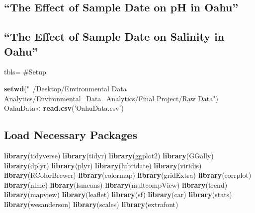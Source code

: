 \documentclass[12pt,]{article}
\newenvironment{Shaded}{\begin{snugshade}}{\end{snugshade}}
\newcommand{\KeywordTok}[1]{\textcolor[rgb]{0.13,0.29,0.53}{\textbf{#1}}}
\newcommand{\StringTok}[1]{\textcolor[rgb]{0.31,0.60,0.02}{#1}}
\newcommand{\NormalTok}[1]{#1}
\begin{document}
\subsection{\texorpdfstring{``The Effect of Sample Date on pH in
Oahu''}{The Effect of Sample Date on pH in Oahu}}\label{the-effect-of-sample-date-on-ph-in-oahu}

\subsection{\texorpdfstring{``The Effect of Sample Date on Salinity in
Oahu''}{The Effect of Sample Date on Salinity in Oahu}}\label{the-effect-of-sample-date-on-salinity-in-oahu}

\newpage

\listoffigures  \newpage

tbls= \#Setup

\begin{Shaded}
\begin{Highlighting}[]
\KeywordTok{setwd}\NormalTok{(}\StringTok{"~/Desktop/Environmental Data Analytics/Environmental_Data_Analytics/Final Project/Raw Data"}\NormalTok{)}
\NormalTok{OahuData<-}\KeywordTok{read.csv}\NormalTok{(}\StringTok{'OahuData.csv'}\NormalTok{)}
\end{Highlighting}
\end{Shaded}

\subsection{Load Necessary Packages}\label{load-necessary-packages}

\begin{Shaded}
\begin{Highlighting}[]
\KeywordTok{library}\NormalTok{(tidyverse)}
\KeywordTok{library}\NormalTok{(tidyr)}
\KeywordTok{library}\NormalTok{(ggplot2)}
\KeywordTok{library}\NormalTok{(GGally)}
\KeywordTok{library}\NormalTok{(dplyr)}
\KeywordTok{library}\NormalTok{(plyr)}
\KeywordTok{library}\NormalTok{(lubridate)}
\KeywordTok{library}\NormalTok{(viridis)}
\KeywordTok{library}\NormalTok{(RColorBrewer)}
\KeywordTok{library}\NormalTok{(colormap)}
\KeywordTok{library}\NormalTok{(gridExtra)}
\KeywordTok{library}\NormalTok{(corrplot)}
\KeywordTok{library}\NormalTok{(nlme)}
\KeywordTok{library}\NormalTok{(lsmeans)}
\KeywordTok{library}\NormalTok{(multcompView)}
\KeywordTok{library}\NormalTok{(trend)}
\KeywordTok{library}\NormalTok{(mapview)}
\KeywordTok{library}\NormalTok{(leaflet)}
\KeywordTok{library}\NormalTok{(sf)}
\KeywordTok{library}\NormalTok{(car)}
\KeywordTok{library}\NormalTok{(stats)}
\KeywordTok{library}\NormalTok{(wesanderson)}
\KeywordTok{library}\NormalTok{(scales)}
\KeywordTok{library}\NormalTok{(extrafont)}
\end{Highlighting}
\end{Shaded}
\end{document}
